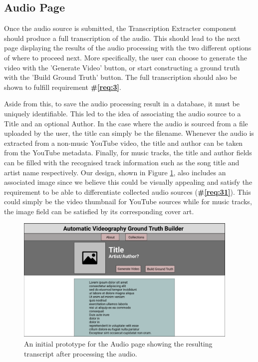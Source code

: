 \documentclass{l4proj}
\begin{document}
\subsection{Audio Page}
Once the audio source is submitted, the Transcription Extracter component should produce a full transcription of the audio. This should lead to the next page displaying the results of the audio processing with the two different options of where to proceed next. More specifically, the user can choose to generate the video with the 'Generate Video' button, or start constructing a ground truth with the 'Build Ground Truth' button. The full transcription should also be shown to fulfill requirement \textbf{\#\ref{req:3}}. 

Aside from this, to save the audio processing result in a database, it must be uniquely identifiable. This led to the idea of associating the audio source to a Title and an optional Author. In the case where the audio is sourced from a file uploaded by the user, the title can simply be the filename. Whenever the audio is extracted from a non-music YouTube video, the title and author can be taken from the YouTube metadata. Finally, for music tracks, the title and author fields can be filled with the recognised track information such as the song title and artist name respectively. Our design, shown in Figure \ref{fig:audio_page}, also includes an associated image since we believe this could be visually appealing and satisfy the requirement to be able to differentiate collected audio sources (\textbf{\#\ref{req:31}}). This could simply be the video thumbnail for YouTube sources while for music tracks, the image field can be satisfied by its corresponding cover art. 

\begin{figure}
    \centering
    \includegraphics[width=0.95\textwidth]{figures/audio_page.pdf}
    \caption{An initial prototype for the Audio page showing the resulting transcript after processing the audio.}
    \label{fig:audio_page}
\end{figure}
\end{document}
